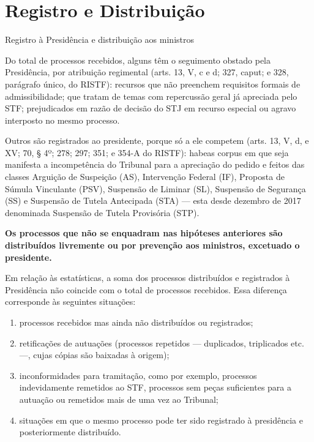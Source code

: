 \documentclass[
]{book}
\begin{document}
\hypertarget{registro-distribuicao}{%
\chapter{Registro e Distribuição}\label{registro-distribuicao}}

Registro à Presidência e distribuição aos ministros

Do total de processos recebidos, alguns têm o seguimento obstado pela Presidência, por atribuição regimental (arts. 13, V, c e d; 327, caput; e 328, parágrafo único, do RISTF): recursos que não preenchem requisitos formais de admissibilidade; que tratam de temas com repercussão geral já apreciada pelo STF; prejudicados em razão de decisão do STJ em recurso especial ou agravo interposto no mesmo processo.

Outros são registrados ao presidente, porque só a ele competem (arts. 13, V, d, e XV; 70, § 4º; 278; 297; 351; e 354-A do RISTF): habeas corpus em que seja manifesta a incompetência do Tribunal para a apreciação do pedido e feitos das classes Arguição de Suspeição (AS), Intervenção Federal (IF), Proposta de Súmula Vinculante (PSV), Suspensão de Liminar (SL), Suspensão de Segurança (SS) e Suspensão de Tutela Antecipada (STA) --- esta desde dezembro de 2017 denominada Suspensão de Tutela Provisória (STP).

\textbf{Os processos que não se enquadram nas hipóteses anteriores são distribuídos livremente ou por prevenção aos ministros, excetuado o presidente.}

Em relação às estatísticas, a soma dos processos distribuídos e registrados à Presidência não coincide com o total de processos recebidos. Essa diferença corresponde às seguintes situações:

\begin{enumerate}
\def\labelenumi{\arabic{enumi}.}
\item
  processos recebidos mas ainda não distribuídos ou registrados;
\item
  retificações de autuações (processos repetidos --- duplicados, triplicados etc. ---, cujas cópias são baixadas à origem);
\item
  inconformidades para tramitação, como por exemplo, processos indevidamente remetidos ao STF, processos sem peças suficientes para a autuação ou remetidos mais de uma vez ao Tribunal;
\item
  situações em que o mesmo processo pode ter sido registrado à presidência e posteriormente distribuído.
\end{enumerate}
\end{document}
